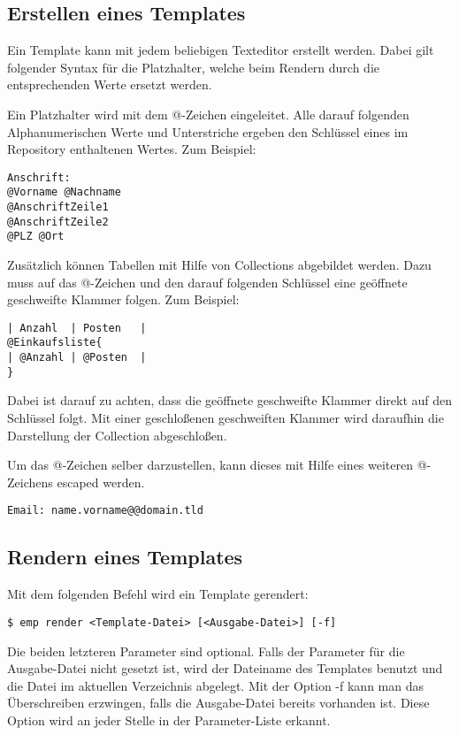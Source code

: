 \subsection{Erstellen eines Templates}
Ein Template kann mit jedem beliebigen Texteditor erstellt werden. Dabei gilt folgender Syntax für die Platzhalter, welche beim Rendern durch die entsprechenden Werte ersetzt werden.

Ein Platzhalter wird mit dem @-Zeichen eingeleitet. Alle darauf folgenden Alphanumerischen Werte und Unterstriche ergeben den Schlüssel eines im Repository enthaltenen Wertes. Zum Beispiel:

\begin{lstlisting}[style=Bash]
Anschrift:
@Vorname @Nachname
@AnschriftZeile1
@AnschriftZeile2
@PLZ @Ort
\end{lstlisting}

Zusätzlich können Tabellen mit Hilfe von Collections abgebildet werden. Dazu muss auf das @-Zeichen und den darauf folgenden Schlüssel eine geöffnete geschweifte Klammer folgen. Zum Beispiel:

\begin{lstlisting}[style=Bash]
| Anzahl  | Posten   |
@Einkaufsliste{
| @Anzahl | @Posten  |
}
\end{lstlisting}

Dabei ist darauf zu achten, dass die geöffnete geschweifte Klammer direkt auf den Schlüssel folgt. Mit einer geschloßenen geschweiften Klammer wird daraufhin die Darstellung der Collection abgeschloßen.

Um das @-Zeichen selber darzustellen, kann dieses mit Hilfe eines weiteren @-Zeichens escaped werden.

\begin{lstlisting}[style=Bash]
Email: name.vorname@@domain.tld
\end{lstlisting}

\subsection{Rendern eines Templates}
Mit dem folgenden Befehl wird ein Template gerendert:
\begin{lstlisting}[style=Bash]
$ emp render <Template-Datei> [<Ausgabe-Datei>] [-f]
\end{lstlisting}

Die beiden letzteren Parameter sind optional. Falls der Parameter für die Ausgabe-Datei nicht gesetzt ist, wird der Dateiname des Templates benutzt und die Datei im aktuellen Verzeichnis abgelegt. Mit der Option -f kann man das Überschreiben erzwingen, falls die Ausgabe-Datei bereits vorhanden ist. Diese Option wird an jeder Stelle in der Parameter-Liste erkannt.

